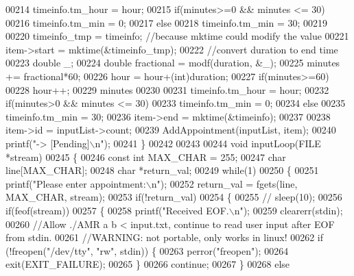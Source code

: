 \begin{DoxyCode}
{{{{{{00214     timeinfo.tm\_hour = hour;
00215     \textcolor{keywordflow}{if}(minutes>=0 && minutes <= 30)
00216         timeinfo.tm\_min = 0;
00217     \textcolor{keywordflow}{else}
00218         timeinfo.tm\_min = 30;
00219 
00220     timeinfo\_tmp = timeinfo;    \textcolor{comment}{//because mktime could modify the value}
00221     item->start = mktime(&timeinfo\_tmp);
00222     \textcolor{comment}{//convert duration to end time}
00223     \textcolor{keywordtype}{double} \_;
00224     \textcolor{keywordtype}{double} fractional = modf(duration, &\_);
00225     minutes += fractional*60;
00226     hour = hour+(int)duration;
00227     \textcolor{keywordflow}{if}(minutes>=60)
00228         hour++;
00229     minutes %
00230 
00231     timeinfo.tm\_hour = hour;
00232     \textcolor{keywordflow}{if}(minutes>0 && minutes <= 30)
00233         timeinfo.tm\_min = 0;
00234     \textcolor{keywordflow}{else}
00235         timeinfo.tm\_min = 30;
00236     item->end = mktime(&timeinfo);
00237 
00238     item->id = inputList->count;
00239     AddAppointment(inputList, item);
00240     printf(\textcolor{stringliteral}{"-> [Pending]\(\backslash\)n"});
00241 \}
00242 
00243 
00244 \textcolor{keywordtype}{void} inputLoop(FILE *stream)
00245 \{
00246     \textcolor{keyword}{const} \textcolor{keywordtype}{int} MAX\_CHAR = 255;
00247     \textcolor{keywordtype}{char} line[MAX\_CHAR];
00248     \textcolor{keywordtype}{char} *return\_val;
00249     \textcolor{keywordflow}{while}(1)
00250     \{
00251         printf(\textcolor{stringliteral}{"Please enter appointment:\(\backslash\)n"});
00252         return\_val = fgets(line, MAX\_CHAR, stream);
00253         \textcolor{keywordflow}{if}(!return\_val)
00254         \{
00255             \textcolor{comment}{// sleep(10);}
00256             \textcolor{keywordflow}{if}(feof(stream))
00257             \{
00258                 printf(\textcolor{stringliteral}{"Received EOF.\(\backslash\)n"});
00259                 clearerr(stdin);
00260                 \textcolor{comment}{//Allow ./AMR a b < input.txt, continue to read user input after EOF from stdin.}
00261                 \textcolor{comment}{//WARNING: not portable, only works in linux!}
00262                 \textcolor{keywordflow}{if} (!freopen(\textcolor{stringliteral}{"/dev/tty"}, \textcolor{stringliteral}{"rw"}, stdin)) \{
00263                     perror(\textcolor{stringliteral}{"freopen"});
00264                     exit(EXIT\_FAILURE);
00265                 \}
00266                 \textcolor{keywordflow}{continue};
00267             \}
00268             \textcolor{keywordflow}{else}
}}}}}}
\end{DoxyCode}
